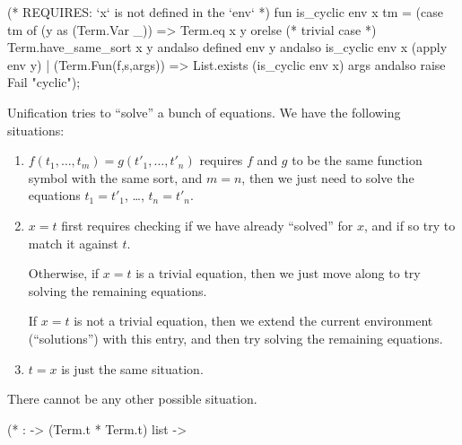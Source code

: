 \nwenddocs{}\endmoddef\nwstartdeflinemarkup{}\nwenddeflinemarkup
(* REQUIRES: `x` is not defined in the `env` *)
fun is_cyclic env x tm =
 (case tm of
   (y as (Term.Var _)) => Term.eq x y orelse (* trivial case *)
                          Term.have_same_sort x y andalso
                          defined env y andalso
                          is_cyclic env x (apply env y)
 | (Term.Fun(f,s,args)) => List.exists (is_cyclic env x) args andalso
                           raise Fail "cyclic");
\nwendcode{}\nwdocspar

\begin{node}
Unification tries to ``solve'' a bunch of equations. We have the
following situations:
\begin{enumerate}
\item $f(t_{1},\dots,t_{m})=g(t'_{1},\dots,t'_{n})$ requires $f$ and
  $g$ to be the same function symbol with the same sort, and $m=n$,
  then we just need to solve the equations $t_{1}=t'_{1}$, \dots, $t_{n}=t'_{n}$.
\item $x=t$ first requires checking if we have already ``solved'' for
  $x$, and if so try to match it against $t$.

  Otherwise, if $x=t$ is a trivial equation, then we just move along
  to try solving the remaining equations.

  If $x=t$ is not a trivial equation, then we extend the current
  environment (``solutions'') with this entry, and then try solving
  the remaining equations.
\item $t=x$ is just the same situation.
\end{enumerate}
There cannot be any other possible situation.
\end{node}

\nwenddocs{}\endmoddef\nwstartdeflinemarkup{}\nwenddeflinemarkup
(*  :  -> (Term.t * Term.t) list -> 

